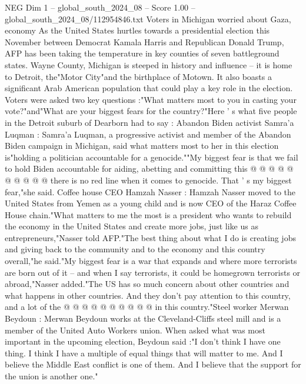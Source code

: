 \begin{textsample}{NEG Dim 1 – global\_south\_2024\_08 – Score 1.00 – global\_south\_2024\_08/112954846.txt}  \label{ex:f1_neg_440}
Voters in Michigan worried about Gaza, economy As the United States hurtles towards a presidential election this November between Democrat Kamala Harris and Republican Donald Trump, AFP has been taking the temperature in key counties of seven battleground states.
Wayne County, Michigan is steeped in history and influence -- it is home to Detroit, the"Motor City"and the birthplace of Motown.
It also boasts a significant Arab American population that could play a key role in the election.
Voters were asked two key questions :"What matters most to you in casting your vote?"and"What are your biggest fears for the country?"Here ' s what five people in the Detroit suburb of Dearborn had to say : Abandon Biden activist Samra'a Luqman : Samra'a Luqman, a progressive activist and member of the Abandon Biden campaign in Michigan, said what matters most to her in this election is"holding a politician accountable for a genocide.""My biggest fear is that we fail to hold Biden accountable for aiding, abetting and committing this @ @ @ @ @ @ @ @ @ @ there is no red line when it comes to genocide.
That ' s my biggest fear,"she said.
Coffee house CEO Hamzah Nasser : Hamzah Nasser moved to the United States from Yemen as a young child and is now CEO of the Haraz Coffee House chain."What matters to me the most is a president who wants to rebuild the economy in the United States and create more jobs, just like us as entrepreneurs,"Nasser told AFP."The best thing about what I do is creating jobs and giving back to the community and to the economy and this country overall,"he said."My biggest fear is a war that expands and where more terrorists are born out of it -- and when I say terrorists, it could be homegrown terrorists or abroad,"Nasser added."The US has so much concern about other countries and what happens in other countries.
And they don't pay attention to this country, and a lot of the @ @ @ @ @ @ @ @ @ @ in this country."Steel worker Merwan Beydoun : Merwan Beydoun works at the Cleveland-Cliffs steel mill and is a member of the United Auto Workers union.
When asked what was most important in the upcoming election, Beydoun said :"I don't think I have one thing.
I think I have a multiple of equal things that will matter to me.
And I believe the Middle East conflict is one of them.
And I believe that the support for the union is another one."

\end{textsample}
